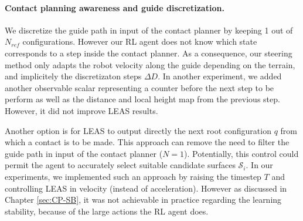 \paragraph{Contact planning awareness and guide discretization.}
We discretize the guide path in input of the contact planner by keeping 1 out of $N_{ref}$ configurations.
However our RL agent does not know which state corresponds to a step inside the contact planner.
As a consequence, our steering method only adapts the robot velocity along the guide depending on the terrain, and implicitely the discretizaton steps $\Delta D$.
In another experiment, we added another observable scalar representing a counter before the next step to be perform as well as the distance and local height map from the previous step. However, it did not improve LEAS results.

Another option is for LEAS to output directly the next root configuration $q$ from which a contact is to be made.
This approach can remove the need to filter the guide path in input of the contact planner ($N=1$).
Potentially, this control could permit the agent to accurately select suitable candidate surfaces $\mathcal{S}_i$.
In our experiments, we implemented such an approach by raising the timestep $T$ and controlling LEAS in velocity (instead of acceleration). However as discussed in Chapter \ref{sec:CP-SB}, it was not achievable in practice regarding the learning stability, because of the large actions the RL agent does.

